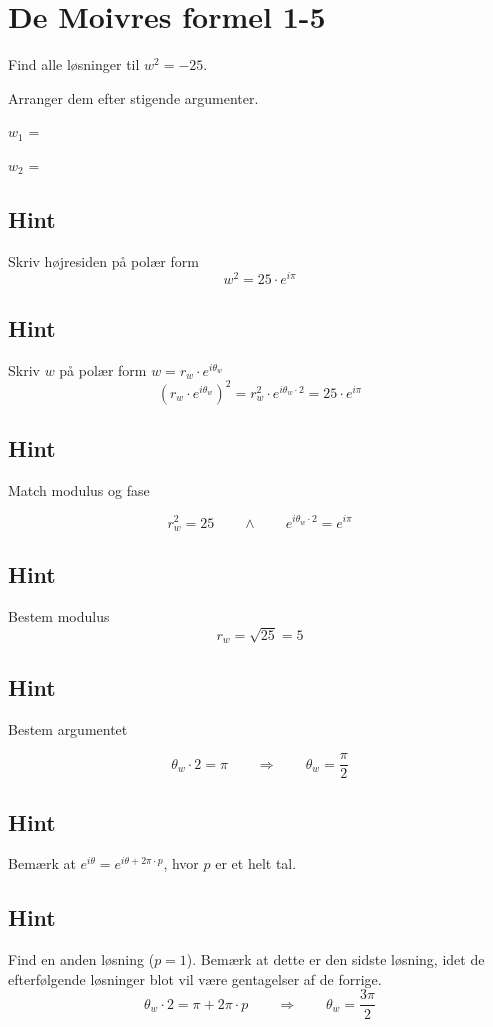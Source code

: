 \documentclass{article}
\newenvironment{exercise}[1]{\newpage\section{#1}}{}
\newcommand{\answerbox}[1]{\fbox{$#1$}}
\newcommand{\hint}{\subsection*{Hint}}
\begin{document}
\newpage

\begin{exercise}{De Moivres formel 1-5}

Find alle løsninger til $w^2=-25$. 

Arranger dem efter stigende argumenter.

$w_1$ = \answerbox{5 \cdot e^{i \frac{\pi}{2}}}		

$w_2$ = \answerbox{5 \cdot e^{i \frac{3 \pi}{2}}}		


\hint 

Skriv højresiden på polær form
\[
w^2 = 25 \cdot e^{i \pi}
\]


\hint

Skriv $w$ på polær form $w = r_w \cdot e^{i \theta_w}$
\[
\left(r_w \cdot e^{i \theta_w}\right)^2 = r_w^2 \cdot e^{i \theta_w \cdot 2} = 25 \cdot e^{i \pi}
\]

\hint 
Match modulus og fase

\[
r_w^2 = 25 \qquad \wedge \qquad e^{i \theta_w \cdot 2} = e^{i \pi}
\]

\hint

Bestem modulus
\[
r_w  =  \sqrt{25} = 5
\]

\hint

Bestem argumentet

\[
\theta_w \cdot 2 = \pi \qquad \Rightarrow \qquad  \theta_w = \frac{\pi}{2}
\]

\hint

Bemærk at $e^{i \theta} = e^{i \theta + 2 \pi \cdot p}$, hvor $p$ er et helt tal.

\hint

Find en anden løsning ($p=1$). 
Bemærk at dette er den sidste løsning, idet de efterfølgende 
løsninger blot vil være gentagelser af de forrige.
\[
\theta_w \cdot 2 = \pi  + 2 \pi \cdot p \qquad \Rightarrow \qquad  \theta_w = \frac{3 \pi}{2}
\]



\end{exercise}

\newpage
\end{document}
